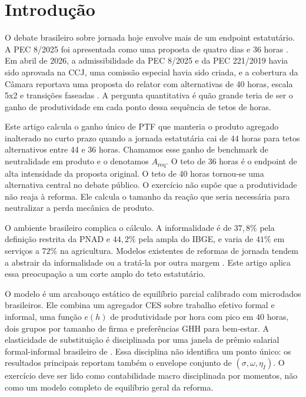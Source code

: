 \documentclass[10pt,twocolumn]{article}
\begin{document}
\section{Introdu\c{c}\~ao}\label{sec:intro}

O debate brasileiro sobre jornada hoje envolve mais de um endpoint estatut\'ario. A PEC 8/2025 foi apresentada como uma proposta de quatro dias e 36 horas \citep{CamaraPEC82025Protocol}. Em abril de 2026, a admissibilidade da PEC 8/2025 e da PEC 221/2019 havia sido aprovada na CCJ, uma comiss\~ao especial havia sido criada, e a cobertura da C\^amara reportava uma proposta do relator com alternativas de 40 horas, escala 5x2 e transi\c{c}\~oes faseadas \citep{CamaraFortyHours2025,CamaraAdmissibility2026,CamaraSpecialCommission2026}. A pergunta quantitativa \'e qu\~ao grande teria de ser o ganho de produtividade em cada ponto dessa sequ\^encia de tetos de horas.

Este artigo calcula o ganho \'unico de PTF que manteria o produto agregado inalterado no curto prazo quando a jornada estatut\'aria cai de 44 horas para tetos alternativos entre 44 e 36 horas. Chamamos esse ganho de benchmark de neutralidade em produto e o denotamos $A_{\text{req}}$. O teto de 36 horas \'e o endpoint de alta intensidade da proposta original. O teto de 40 horas tornou-se uma alternativa central no debate p\'ublico. O exerc\'icio n\~ao sup\~oe que a produtividade n\~ao reaja \`a reforma. Ele calcula o tamanho da rea\c{c}\~ao que seria necess\'aria para neutralizar a perda mec\^anica de produto.

O ambiente brasileiro complica o c\'alculo. A informalidade \'e de $37{,}8\%$ pela defini\c{c}\~ao restrita da PNAD e $44{,}2\%$ pela ampla do IBGE, e varia de $41\%$ em servi\c{c}os a $72\%$ na agricultura. Modelos existentes de reformas de jornada tendem a abstrair da informalidade \citep{Cacciatore2016} ou a trat\'a-la por outra margem \citep{Ulyssea2018}. Este artigo aplica essa preocupa\c{c}\~ao a um corte amplo do teto estatut\'ario.

O modelo \'e um arcabou\c{c}o est\'atico de equil\'ibrio parcial calibrado com microdados brasileiros. Ele combina um agregador CES sobre trabalho efetivo formal e informal, uma fun\c{c}\~ao $e(h)$ de produtividade por hora com pico em $40$ horas, dois grupos por tamanho de firma e prefer\^encias GHH para bem-estar. A elasticidade de substitui\c{c}\~ao \'e disciplinada por uma janela de pr\^emio salarial formal-informal brasileiro de \citet{MeghirNaritaRobin2015}. Essa disciplina n\~ao identifica um ponto \'unico: os resultados principais reportam tamb\'em o envelope conjunto de $(\sigma,\omega,\eta_I)$. O exerc\'icio deve ser lido como contabilidade macro disciplinada por momentos, n\~ao como um modelo completo de equil\'ibrio geral da reforma.
\end{document}
